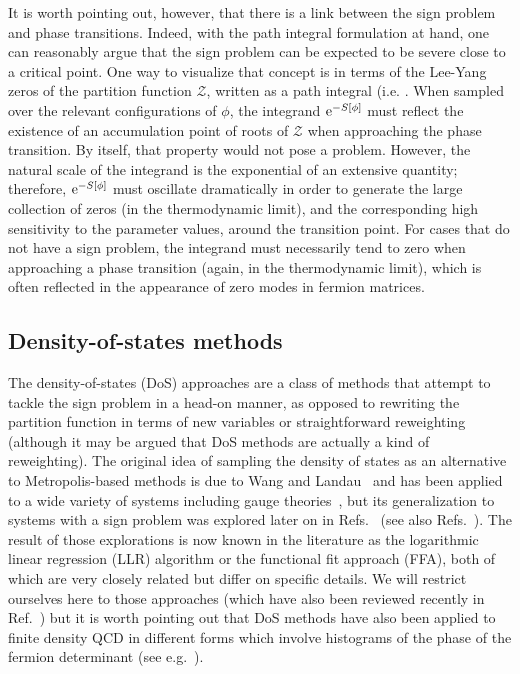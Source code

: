 \documentclass[../main.tex]{subfiles}
\begin{document}
It is worth pointing out, however, that there is a link between the sign problem and phase transitions. Indeed, with the path integral formulation
at hand, one can reasonably argue that the sign problem can be expected to be severe close to a critical point. One way to
visualize that concept is in terms of the Lee-Yang zeros of the partition function $\mathcal Z$, written as a path integral (i.e. .
When sampled over the relevant configurations of $\phi$, the integrand ${\rm e}^{-S[\phi]}$ must reflect the existence of an accumulation point of roots of $\mathcal Z$
when approaching the phase transition. By itself, that property would not pose a problem. However, the natural scale of the integrand is
the exponential of an extensive quantity; therefore, ${\rm e}^{-S[\phi]}$ must oscillate dramatically in order to generate the large collection of zeros
(in the thermodynamic limit), and the corresponding high sensitivity to the parameter values, around the transition point. For cases that do not have
a sign problem, the integrand must necessarily tend to zero when approaching a phase transition (again, in the thermodynamic limit), which is
often reflected in the appearance of zero modes in fermion matrices.



\subsection{Density-of-states methods~\label{sect:DensityOfStates}}

The density-of-states (DoS) approaches are a class of methods that attempt to tackle the sign problem in a head-on
manner, as opposed to rewriting the partition function in terms of new variables or straightforward reweighting (although it may be argued that DoS
methods are actually a kind of reweighting). The original idea of sampling the density of states as an alternative to Metropolis-based
methods is due to Wang and Landau~\cite{PhysRevLett.86.2050} and has been applied to a wide variety of systems including gauge
theories~\cite{PhysRevD.85.056010, PhysRevLett.109.111601}, but its generalization to systems with a sign problem was
explored later on in Refs.~\cite{Fodor:2007vv, PhysRevD.90.094502, 1742-6596-631-1-012063, PhysRevD.88.071502} (see also Refs.~\cite{PhysRevLett.61.2054, Schmidt:2006us}). The result of those explorations is now known
in the literature as the logarithmic linear regression (LLR) algorithm or the functional fit approach (FFA), both of which are very closely related
but differ on specific details. We will restrict ourselves here to those approaches (which have also been reviewed recently in
Ref.~\cite{Gattringer:2016kco}) but it is worth pointing out that DoS methods have also been applied to finite density QCD
in different forms which involve histograms of the phase of the fermion determinant (see e.g.~\cite{PhysRevD.77.014508, PhysRevD.78.074507, 10.1093/ptep/pts005}).
\end{document}
